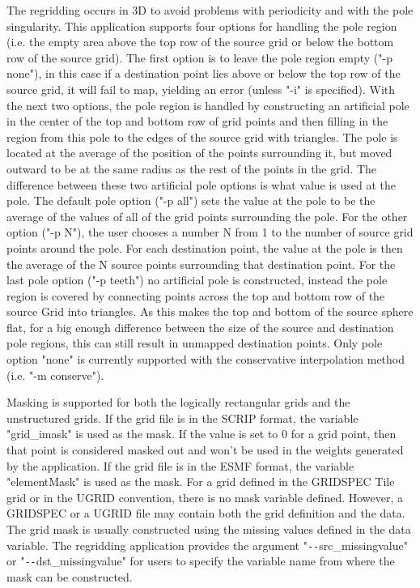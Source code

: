 The regridding occurs in 3D to avoid
problems with periodicity and with the pole singularity. This application
supports four options for handling the pole region (i.e. the empty area above the top row of the source grid or below
the bottom row of the source grid).  The first option is to leave the pole region empty ("-p none"), in this 
case if a destination point lies above or below the 
top row of the source grid, it will fail to map, yielding an error (unless "-i" is specified).  
With the next two options, the pole region is handled by constructing 
an artificial pole in the center of the top and bottom row of grid points and then filling
in the region from this pole to the edges of the source grid with triangles. 
The pole is located at the average of the position of the points surrounding
it, but moved outward to be at the same radius as the rest of the points
in the grid. The difference between these two artificial pole options is what value is used at the pole. 
The default pole option ("-p all") sets the value at the pole to be the average of the values
of all of the grid points surrounding the pole. For the other option ("-p N"), the user chooses
a number N from 1 to the number of source grid points around the pole. For
each destination point, the value at the pole is then the average of the N source points
surrounding that destination point. For the last pole option ("-p teeth") no artificial pole is constructed, instead the
pole region is covered by connecting points across the top and bottom row of the source Grid into triangles. As 
this makes the top and bottom of the source sphere flat, for a big enough difference between the size of
the source and destination pole regions, this can still result in unmapped destination points.  
Only pole option "none" is currently supported with the conservative interpolation method (i.e. "-m conserve"). 

Masking is supported for both the logically rectangular grids and the unstructured grids. 
If the grid file is in the SCRIP format, the variable "grid\_imask" is used as the mask.
If the value is set to 0 for a grid point, then that point is considered masked out and 
won't be used in the weights generated by the application. If the grid file is in the ESMF format, the variable "elementMask" is used as the mask.  For a grid defined in the GRIDSPEC 
Tile grid or in the UGRID convention, there is no mask variable defined.
However, a GRIDSPEC or a UGRID file may contain both the grid definition and the data.  
The grid mask is usually constructed using the missing values defined in the data variable.
The regridding application provides the argument "\verb+--+src\_missingvalue" or 
"\verb+--+dst\_missingvalue" for users to specify the variable name from where the mask can be
constructed. 

